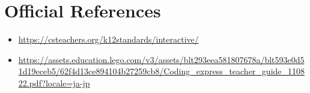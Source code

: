 \documentclass[11pt]{article}
\begin{document}
    \section*{Official References}
    \begin{itemize}[leftmargin=*]
    \item \url{https://csteachers.org/k12standards/interactive/}
\item \url{https://assets.education.lego.com/v3/assets/blt293eea581807678a/blt593e0d51d19eceb5/62f4d13ce894104b27259cb8/Coding_express_teacher_guide_110822.pdf?locale=ja-jp}

    \end{itemize}
    
\end{document}
